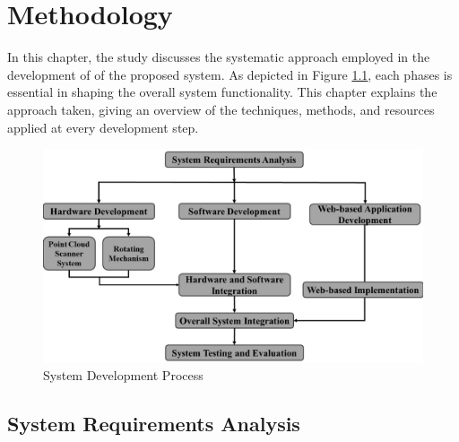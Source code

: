 \renewcommand{\thechapter}{\Roman{chapter}}
\chapter{Methodology}
\renewcommand{\thechapter}{\arabic{chapter}}
\label{ch3:Methodology}
\thispagestyle{empty}

In this chapter, the study discusses the systematic approach employed in the development of of the proposed system. As depicted in Figure \ref{ch3:fig:system_development_process}, each phases is essential in shaping the overall system functionality. This chapter explains the approach taken, giving an overview of the techniques, methods, and resources applied at every development step.

\begin{figure}[H]
	\centering
	\includegraphics[width=1\textwidth]{Figures/system_development_process}
	\caption{System Development Process}
	\label{ch3:fig:system_development_process}
\end{figure}

\section{System Requirements Analysis}
\label{ch3:sec:system_requirements_analysis}

